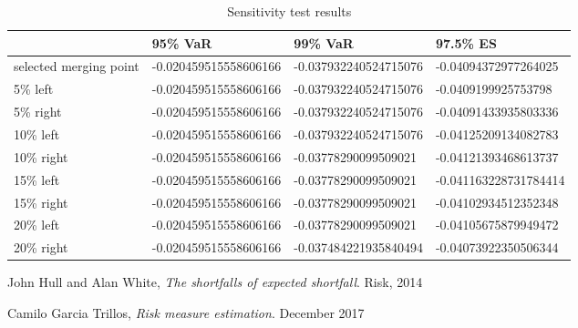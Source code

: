 \documentclass{article}
\begin{document}
\begin{table}[H]
    \centering
    \caption{Sensitivity test results}
    \begin{tabular}{|l|l|l|l|}
    \hline
                           & 95\% VaR              & 99\% VaR              & 97.5\% ES             \\ \hline
    selected merging point & -0.020459515558606166 & -0.037932240524715076 & -0.04094372977264025  \\ \hline
    5\% left               & -0.020459515558606166 & -0.037932240524715076 & -0.0409199925753798   \\ \hline
    5\% right              & -0.020459515558606166 & -0.037932240524715076 & -0.04091433935803336  \\ \hline
    10\% left              & -0.020459515558606166 & -0.037932240524715076 & -0.04125209134082783  \\ \hline
    10\% right             & -0.020459515558606166 & -0.03778290099509021  & -0.04121393468613737  \\ \hline
    15\% left              & -0.020459515558606166 & -0.03778290099509021  & -0.041163228731784414 \\ \hline
    15\% right             & -0.020459515558606166 & -0.03778290099509021  & -0.04102934512352348  \\ \hline
    20\% left              & -0.020459515558606166 & -0.03778290099509021  & -0.04105675879949472  \\ \hline
    20\% right             & -0.020459515558606166 & -0.037484221935840494 & -0.04073922350506344  \\ \hline
    \end{tabular}
\end{table}

\begin{thebibliography}{9}
John Hull and Alan White,
\textit{The shortfalls of expected shortfall}.
Risk, 2014

Camilo Garcia Trillos,
\textit{Risk measure estimation}.
December 2017
\end{thebibliography}
\end{document}
